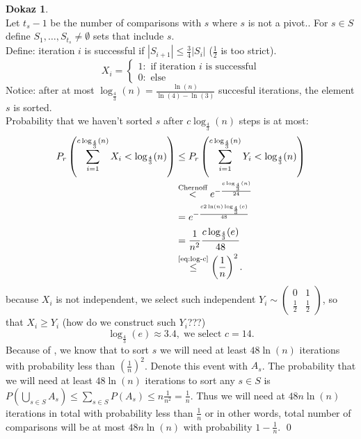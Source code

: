 \documentclass[a4paper, 12pt]{book}
\theoremstyle{definition}
\newtheorem{pro}[counter]{Dokaz}
\theoremstyle{remark}
\begin{document}
\begin{pro} \text{} \\
  Let $t_s - 1$ be the number of comparisons with $s$ where $s$ is not a pivot.. For $s \in S$ define $S_1, \dots, S_{t_s} \neq \emptyset$ sets that include $s$. \\
  Define: iteration $i$ is successful if $|S_{i+1}| \leq \frac{3}{4} |S_i|$ ($\frac{1}{2}$ is too strict).
  \begin{equation*}
    X_i = \begin{cases}
      1: \text{ if iteration } i \text{ is successful} \\
      0: \text{ else}
    \end{cases}
  \end{equation*}
  Notice: after at most $\log_{\frac{4}{3}}(n) = \frac{\ln(n)}{\ln(4)-\ln(3)}$ succesful iterations, the element $s$ is sorted. \\
  Probability that we haven't sorted $s$ after $c\log_{\frac{4}{3}}(n)$ steps is at most:
  \begin{align}
    P_r\left(\sum_{i=1}^{c \log_{\frac{4}{3}}(n)} X_i < \log_{\frac{4}{3}}(n)\right) &\leq
      P_r\left(\sum_{i=1}^{c \log_{\frac{4}{3}}(n)} Y_i < \log_{\frac{4}{3}}(n)\right) \label{eq:X_to_Y} \\
    &\stackrel{\text{Chernoff}}{<} e^{-\frac{c \log_{\frac{4}{3}}(n)}{24}} \nonumber \\
    &= e^{-\frac{c 2\ln(n) \log_{\frac{4}{3}}(e)}{48}} \nonumber\\
    &= \frac{1}{n^2} \frac{c \log_{\frac{4}{3}}(e)}{48} \nonumber \\
    &\stackrel{\refeq{eq:log-c}}{\leq} \left(\frac{1}{n}\right)^2. \nonumber
  \end{align}
   because $X_i$ is not independent, we select such independent
  $Y_i \sim \begin{pmatrix}0 & 1 \\ \frac{1}{2} & \frac{1}{2}\end{pmatrix}$, so that $X_i \geq Y_i$ (how do we construct such $Y_i$???)
  \begin{equation}
    \label{eq:log-c}
    \log_{\frac{4}{3}}(e) \approx 3.4, \; \text{we select }c=14.
  \end{equation}
  Because of , we know that to sort $s$ we will need at least $48 \ln(n)$ iterations with probability less than $\left(\frac{1}{n}\right)^2$. Denote this event with $A_s$.
  The probability that we will need at least $48 \ln(n)$ iterations to sort any $s \in S$ is $P(\bigcup_{s \in S}A_s) \leq \sum_{s \in S}P(A_s) \leq n\frac{1}{n^2} = \frac{1}{n}$.
  Thus we will need at $48n\ln(n)$ iterations in total with probability less than $\frac{1}{n}$ or in other words, total number of comparisons will be at most $48n\ln(n)$ with probability $1 - \frac{1}{n}$.
  \qed
\end{pro}
\end{document}
